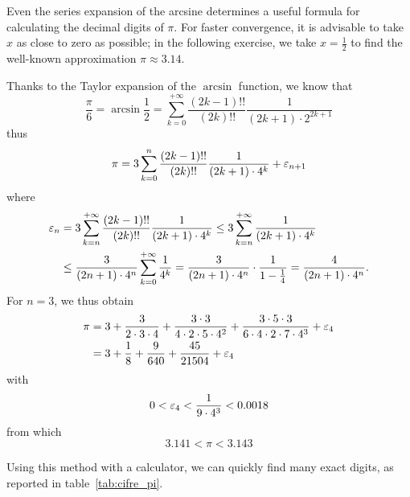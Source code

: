 Even the series expansion of the arcsine determines a useful formula for
calculating the decimal digits of $\pi$. For faster convergence, it is advisable
to take $x$ as close to zero as possible; in the following exercise, we take
$x=\frac 1 2$ to find the well-known approximation $\pi \approx 3.14$.

\begin{exercise}
  \label{ex:cifre_pi}
  Thanks to the Taylor expansion of the $\arcsin$ function, we know that
  \[
    \frac \pi 6
    = \arcsin \frac 1 2
        = \sum_{k=0}^{+\infty} \frac{(2k-1)!!}{(2k)!!} \frac{1}{(2k+1)\cdot
    2^{2k+1}}
  \]
  thus
  \[
    \pi = 3 \sum_{k=0}^n \frac{(2k-1)!!}{(2k)!!} \frac{1}{(2k+1)\cdot 4^k} + \varepsilon_{n+1}
  \]
  where
  \begin{align*}
   \varepsilon_n
   &= 3 \sum_{k=n}^{+\infty} \frac{(2k-1)!!}{(2k)!!} \frac{1}{(2k+1)\cdot 4^k}
   \le 3 \sum_{k=n}^{+\infty} \frac{1}{(2k+1)\cdot 4^k} \\
   &\le \frac{3}{(2n+1)\cdot 4^n} \sum_{k=0}^{+\infty} \frac{1}{4^k}
   = \frac{3}{(2n+1)\cdot 4^n} \cdot \frac{1}{1-\frac 1 4}
   = \frac{4}{(2n+1)\cdot 4^n}.
 \end{align*}
 For $n=3$, we thus obtain
 \begin{align*}
  \pi
    &= 3 + \frac{3}{2\cdot 3 \cdot 4} + \frac{3\cdot 3}{4\cdot 2 \cdot 5 \cdot
  4^2}
  + \frac{3\cdot 5\cdot 3}{6\cdot 4\cdot 2 \cdot 7 \cdot 4^3} + \varepsilon_4 \\
  &= 3+\frac{1}{8} + \frac{9}{640} + \frac{45}{21504} + \varepsilon_4
\end{align*}
 with
 \[
 0 < \varepsilon_4 < \frac{1}{9\cdot 4^3} < 0.0018
 \]
 from which
 \[
   3.141 < \pi < 3.143
 \]

  Using this method with a calculator, we can quickly find many exact digits, as
 reported in table~\ref{tab:cifre_pi}.
\end{exercise}
%
